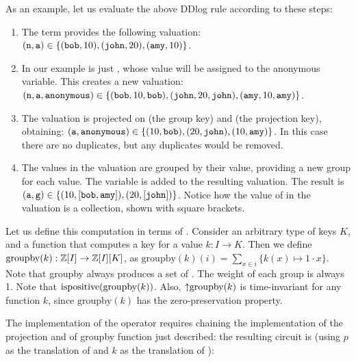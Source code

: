 As an example, let us evaluate the above DDlog rule according to these steps:

\begin{enumerate}
    \item The term  provides the following valuation: \\
    $(\mbox{\texttt{n}},\mbox{\texttt{a}}) \in \{ (\mbox{\texttt{bob}}, 10), (\mbox{\texttt{john}}, 20), (\mbox{\texttt{amy}}, 10) \}$.
    \item In our example  is just , whose value
    will be assigned to the anonymous variable.  This creates a new valuation: \\
    $(\mbox{\texttt{n}},\mbox{\texttt{a}}, \mbox{\texttt{anonymous}}) \in \{ (\mbox{\texttt{bob}}, 10, \mbox{\texttt{bob}}),
    (\mbox{\texttt{john}}, 20, \mbox{\texttt{john}}),  (\mbox{\texttt{amy}}, 10, \mbox{\texttt{amy}}) \}$.
    \item The valuation is projected on  (the group key) and 
    (the projection key), obtaining:
    $(\mbox{\texttt{a}}, \mbox{\texttt{anonymous}}) \in \{ (10, \mbox{\texttt{bob}}), (20, \mbox{\texttt{john}}),  (10, \mbox{\texttt{amy}}) \}$.
    In this case there are no duplicates, but any duplicates would be removed.
    \item The values in the valuation are grouped by their  value, providing
    a new group for each value.  The variable  is added to the resulting valuation.
    The result is $(\mbox{\texttt{a}}, \mbox{\texttt{g}}) \in \{ (10, [\mbox{\texttt{bob}}, \mbox{\texttt{amy}}]), (20, [\mbox{\texttt{john}}]) \}$.
    Notice how the value of  in the valuation is a collection, shown with square brackets.
\end{enumerate}

Let us define this computation in terms of \zrs.  Consider an arbitrary type of
keys $K$, and a function that computes a key for a value $k: I \rightarrow K$.
Then we define $\mbox{groupby}(k): \mathbb{Z}[I] \rightarrow \mathbb{Z}[I][K]$, as
$\mbox{groupby}(k)(i) = \sum_{x \in i} \{ k(x) \mapsto 1 \cdot x \}$.
Note that groupby always produces a set of \zrs.  The weight of each group
is always 1.  Note that $\mbox{ispositive}(\mbox{groupby}(k))$.  Also, ${\uparrow}\mbox{groupby}(k)$
is time-invariant for any function $k$, since $\mbox{groupby}(k)$ has the zero-preservation
property.

The implementation of the  operator requires chaining the implementation of the
projection and of groupby function just described:
the resulting circuit is (using $p$ as the translation of  and $k$ as
the translation of ):

